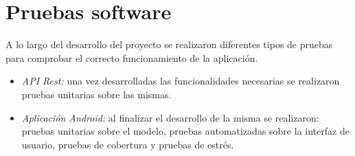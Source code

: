 \section{Pruebas software}

A lo largo del desarrollo del proyecto se realizaron diferentes tipos de pruebas para comprobar el correcto funcionamiento de la aplicación.

\begin{itemize}
	\item \emph{API Rest:} una vez desarrolladas las funcionalidades necesarias se realizaron pruebas unitarias sobre las mismas.
	\item \emph{Aplicación Android:} al finalizar el desarrollo de la misma se realizaron: pruebas unitarias sobre el modelo, pruebas automatizadas sobre la interfaz de usuario, pruebas de cobertura y pruebas de estrés.
\end{itemize}

